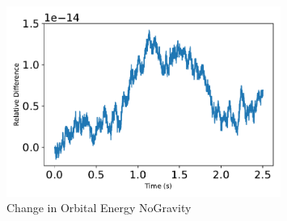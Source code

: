 \begin{figure}[htbp]\centerline{\includegraphics[width=0.8\textwidth]{AutoTeX/ChangeInOrbitalEnergyNoGravity}}\caption{Change in Orbital Energy NoGravity}\label{fig:ChangeInOrbitalEnergyNoGravity}\end{figure}